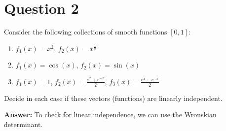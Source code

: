 \documentclass{article}
\begin{document}
\newpage

\section*{Question 2}
Consider the following collections of smooth functions $[0,1]$:
\begin{enumerate}
    \item $f_1(x) = x^2$, $f_2(x) = x^{\frac{1}{2}}$
    \item $f_1(x) = \cos(x)$, $f_2(x) = \sin(x)$
    \item $f_1(x) = 1$, $f_2(x) = \frac{e^x + e^{-x}}{2}$, $f_3(x) = \frac{e^x - e^{-x}}{2}$
\end{enumerate}
Decide in each case if these vectors (functions) are linearly independent.

\medskip
\noindent
\textbf{Answer:} To check for linear independence, we can use the Wronskian determinant.
\end{document}

